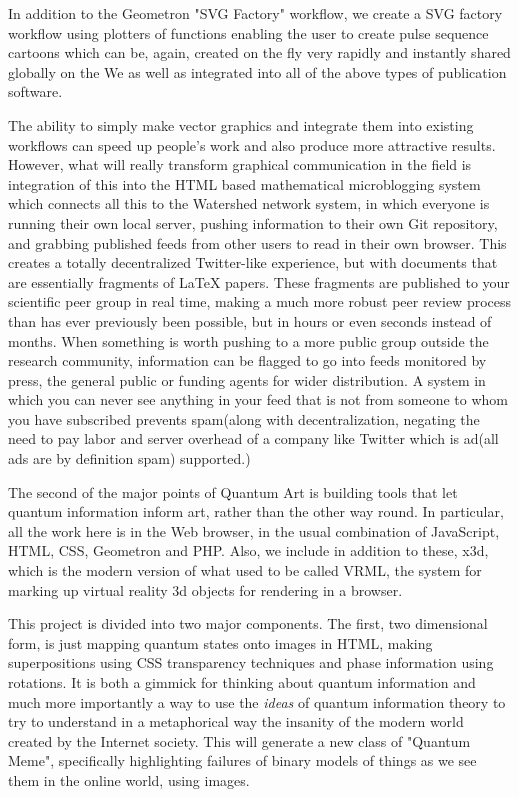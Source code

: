 \documentclass[11pt]{article}
\begin{document}
    In addition to the Geometron "SVG Factory" workflow, we create a SVG factory workflow using plotters of functions enabling the user to create pulse sequence cartoons which can be, again, created on the fly very rapidly and instantly shared globally on the We as well as integrated into all of the above types of publication software.



The ability to simply make vector graphics and integrate them into existing workflows can speed up people's work and also produce more attractive results.  However, what will really transform graphical communication in the field is integration of this into the HTML based mathematical microblogging system which connects all this to the Watershed network system, in which everyone is running their own local server, pushing information to their own Git repository, and grabbing published feeds from other users to read in their own browser.  This creates a totally decentralized Twitter-like experience, but with documents that are essentially fragments of LaTeX papers.  These fragments are published to your scientific peer group in real time, making a much more robust peer review process than has ever previously been possible, but in hours or even seconds instead of months.  When something is worth pushing to a more public group outside the research community, information can be flagged to go into feeds monitored by press, the general public or funding agents for wider distribution.  A system in which you can never see anything in your feed that is not from someone to whom you have subscribed prevents spam(along with decentralization, negating the need to pay labor and server overhead of a company like Twitter which is ad(all ads are by definition spam) supported.)





    The second of the major points of Quantum Art is building tools that let quantum information inform art, rather than the other way round.  In particular, all the work here is in the Web browser, in the usual combination of JavaScript, HTML, CSS, Geometron and PHP.  Also, we include in addition to these, x3d, which is the modern version of what used to be called VRML, the system for marking up virtual reality 3d objects for rendering in a browser.  



This project is divided into two major components. The first, two dimensional form, is just mapping quantum states onto images in HTML, making superpositions using CSS transparency techniques and phase information using rotations.  It is both a gimmick for thinking about quantum information and much more importantly a way to use the \textit{
ideas} of quantum information theory to try to understand in a metaphorical way the insanity of the modern world created by the Internet society.  This will generate a new class of "Quantum Meme", specifically highlighting failures of binary models of things as we see them in the online world, using images. 
\end{document}
